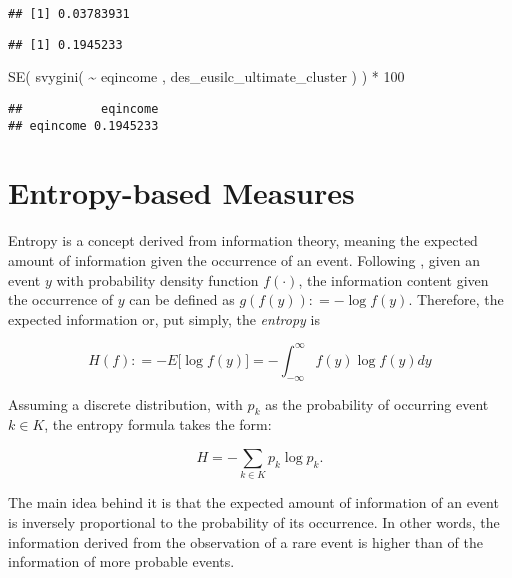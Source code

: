 \documentclass[
]{book}
\newenvironment{Shaded}{\begin{snugshade}}{\end{snugshade}}
\newcommand{\CommentTok}[1]{\textcolor[rgb]{0.56,0.35,0.01}{\textit{#1}}}
\newcommand{\DecValTok}[1]{\textcolor[rgb]{0.00,0.00,0.81}{#1}}
\newcommand{\FunctionTok}[1]{\textcolor[rgb]{0.00,0.00,0.00}{#1}}
\newcommand{\NormalTok}[1]{#1}
\newcommand{\SpecialCharTok}[1]{\textcolor[rgb]{0.00,0.00,0.00}{#1}}
\begin{document}
\begin{verbatim}
## [1] 0.03783931
\end{verbatim}

\begin{Shaded}
\end{Shaded}

\begin{verbatim}
## [1] 0.1945233
\end{verbatim}

\begin{Shaded}
\begin{Highlighting}[]
\FunctionTok{SE}\NormalTok{( }\FunctionTok{svygini}\NormalTok{( }\SpecialCharTok{\textasciitilde{}}\NormalTok{ eqincome , des\_eusilc\_ultimate\_cluster ) ) }\SpecialCharTok{*} \DecValTok{100}
\end{Highlighting}
\end{Shaded}

\begin{verbatim}
##           eqincome
## eqincome 0.1945233
\end{verbatim}

\hypertarget{entropy-based-measures}{%
\section{Entropy-based Measures}\label{entropy-based-measures}}

Entropy is a concept derived from information theory, meaning the expected amount of information given the occurrence of an event. Following \autocite{shannon1948}, given an event \(y\) with probability density function \(f(\cdot)\), the information content given the occurrence of \(y\) can be defined as \(g(f(y)) \colon= - \log f(y)\). Therefore, the expected information or, put simply, the \emph{entropy} is

\[
H(f) \colon = -E \big[ \log f(y) \big] = - \int_{-\infty}^{\infty} f(y) \log f(y) dy
\]

Assuming a discrete distribution, with \(p_k\) as the probability of occurring event \(k \in K\), the entropy formula takes the form:

\[
H = - \sum_{k \in K} p_k \log p_k \text{.}
\]

The main idea behind it is that the expected amount of information of an event is inversely proportional to the probability of its occurrence. In other words, the information derived from the observation of a rare event is higher than of the information of more probable events.
\end{document}
